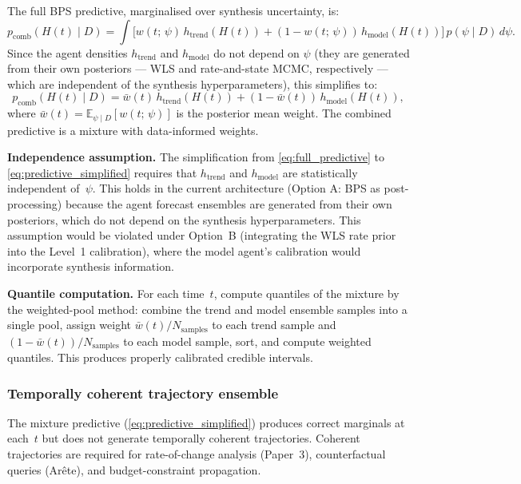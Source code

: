 \documentclass[11pt]{article}
\begin{document}
The full BPS predictive, marginalised over synthesis uncertainty, is:
\begin{equation}
  p_{\mathrm{comb}}(H(t) \mid D) = \int \Big[w(t;\,\psi)\,h_{\mathrm{trend}}(H(t)) + (1 - w(t;\,\psi))\,h_{\mathrm{model}}(H(t))\Big]\,p(\psi \mid D)\,d\psi.
  \label{eq:full_predictive}
\end{equation}
Since the agent densities $h_{\mathrm{trend}}$ and $h_{\mathrm{model}}$ do not depend on $\psi$ (they are generated from their own posteriors --- WLS and rate-and-state MCMC, respectively --- which are independent of the synthesis hyperparameters), this simplifies to:
\begin{equation}
  p_{\mathrm{comb}}(H(t) \mid D) = \bar{w}(t)\,h_{\mathrm{trend}}(H(t)) + (1 - \bar{w}(t))\,h_{\mathrm{model}}(H(t)),
  \label{eq:predictive_simplified}
\end{equation}
where $\bar{w}(t) = \mathbb{E}_{\psi \mid D}[w(t;\,\psi)]$ is the posterior mean weight.  The combined predictive is a mixture with data-informed weights.

\textbf{Independence assumption.}  The simplification from \cref{eq:full_predictive} to \cref{eq:predictive_simplified} requires that $h_{\mathrm{trend}}$ and $h_{\mathrm{model}}$ are statistically independent of~$\psi$.  This holds in the current architecture (Option A: BPS as post-processing) because the agent forecast ensembles are generated from their own posteriors, which do not depend on the synthesis hyperparameters.  This assumption would be violated under Option~B (integrating the WLS rate prior into the Level~1 calibration), where the model agent's calibration would incorporate synthesis information.

\textbf{Quantile computation.}  For each time~$t$, compute quantiles of the mixture by the weighted-pool method: combine the trend and model ensemble samples into a single pool, assign weight $\bar{w}(t) / N_{\mathrm{samples}}$ to each trend sample and $(1 - \bar{w}(t)) / N_{\mathrm{samples}}$ to each model sample, sort, and compute weighted quantiles.  This produces properly calibrated credible intervals.


\subsubsection{Temporally coherent trajectory ensemble}
\label{sec:coherent_trajectories}

The mixture predictive (\cref{eq:predictive_simplified}) produces correct marginals at each~$t$ but does not generate temporally coherent trajectories.  Coherent trajectories are required for rate-of-change analysis (Paper~3), counterfactual queries (Ar\^ete), and budget-constraint propagation.
\end{document}
